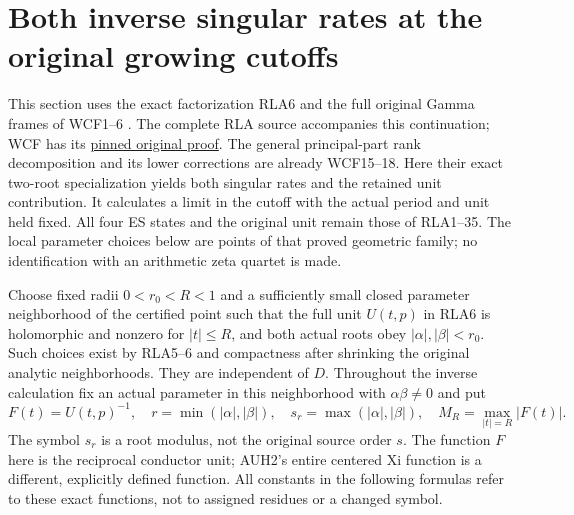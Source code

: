 \section{Both inverse singular rates at the original growing cutoffs}
This section uses the exact factorization RLA6 \cite{RLA008} and the full original
Gamma frames of WCF1--6 \cite{WCF,DLMF18Source}. The complete RLA source accompanies
this continuation; WCF has its
\href{https://github.com/KokunoYumeto/zeta-function-research-reader/blob/5992ad50c0f2a06921f1fcaded7b4e38097c0739/workbenches/splitzero-tandem/continuations/20260920-original-kernel-mixed-determinants/providers/WEIGHTED_CONDUCTOR_FORWARD.tex#L28}{pinned original proof}.
The general principal-part rank decomposition and its lower corrections
are already WCF15--18. Here their exact two-root specialization yields
both singular rates and the retained unit contribution.
It calculates a limit in the cutoff with
the actual period and unit held fixed.  All four ES states and the
original unit remain those of RLA1--35.  The local parameter choices
below are points of that proved geometric family; no identification
with an arithmetic zeta quartet is made.

Choose fixed radii $0<r_0<R<1$ and a sufficiently small closed
parameter neighborhood of the certified point such that the full
unit $U(t,p)$ in RLA6 is holomorphic and nonzero for $|t|\le R$,
and both actual roots obey $|\alpha|,|\beta|<r_0$.
Such choices exist by RLA5--6 and compactness after shrinking
the original analytic neighborhoods.  They are independent of $D$.
Throughout the inverse calculation fix an actual parameter in this
neighborhood with $\alpha\beta\ne0$ and put
\[
 F(t)=U(t,p)^{-1},\quad
 r=\min(|\alpha|,|\beta|),\quad
 s_r=\max(|\alpha|,|\beta|),\quad
 M_R=\max_{|t|=R}|F(t)|.
 \tag{RCM1}
\]
The symbol $s_r$ is a root modulus, not the original source order
$s$. The function $F$ here is the reciprocal conductor unit; AUH2's
entire centered Xi function is a different, explicitly defined function.
All constants in the following formulas refer to these exact
functions, not to assigned residues or a changed symbol.

